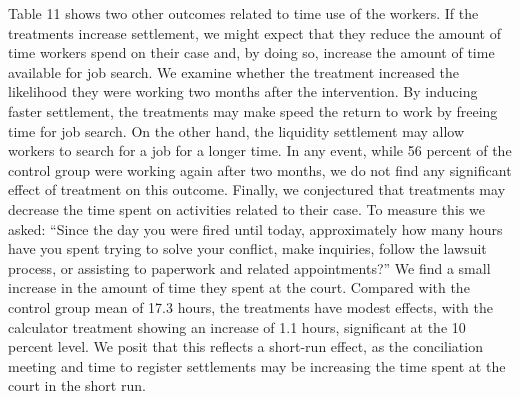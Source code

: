 \documentclass[12 pt]{article}
\begin{document}
Table 11 shows two other outcomes related to time use of the workers. If the treatments increase settlement, we might expect that they reduce the amount of time workers spend on their case and, by doing so, increase the amount of time available for job search. We examine whether the treatment increased the likelihood they were working two months after the intervention. By inducing faster settlement, the treatments may make speed the return to work by freeing time for job search. On the other hand, the liquidity settlement may allow workers to search for a job for a longer time. In any event, while 56 percent of the control group were working again after two months, we do not find any significant effect of treatment on this outcome. Finally, we conjectured that treatments may decrease the time spent on activities related to their case. To measure this we asked: “Since the day you were fired until today, approximately how many hours have you spent trying to solve your conflict, make inquiries, follow the lawsuit process, or assisting to paperwork and related appointments?” We find a small increase in the amount of time they spent at the court. Compared with the control group mean of 17.3 hours, the treatments have modest effects, with the calculator treatment showing an increase of 1.1 hours, significant at the 10 percent level. We posit that this reflects a short-run effect, as the conciliation meeting and time to register settlements may be increasing the time spent at the court in the short run.

\end{document}
